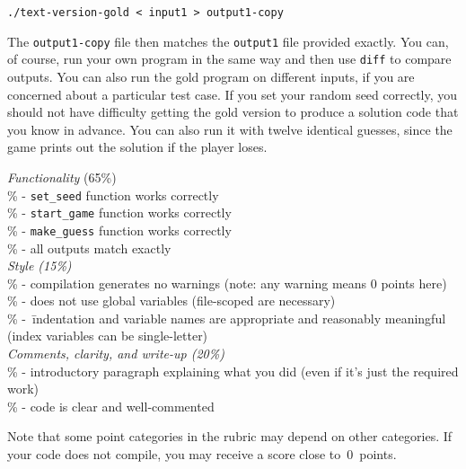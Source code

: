 \protect{\mbox{\hspace{.25in}}}%
{\tt ./text-version-gold < input1 > output1-copy}

The {\tt output1-copy} file then matches the {\tt output1} file provided 
exactly.  You can, of course, run your own program in the same way and
then use {\tt diff} to compare outputs.  You can also run the gold 
program on different inputs, if you are concerned about a particular test
case.  If you set your random seed correctly, you should not have 
difficulty getting the gold version to produce a solution code that you
know in advance.  You can also run it with twelve identical
guesses, since the game prints out the solution if the player loses.\\


\pagebreak

%
\begin{tabbing}
\textit{Func}\=\textit{tionality} (65\%)\\
  \% - {\tt set\_seed} function works correctly\\
  \% - {\tt start\_game} function works correctly\\
  \% - {\tt make\_guess} function works correctly\\
  \% - all outputs match exactly\\
\textit{Style (15\%)}\\
  \% - compilation generates no warnings (note: any warning means 0 points here)\\
  \% - does not use global variables (file-scoped are necessary)\\
  \% -~\=indentation and variable names are appropriate and reasonably meaningful\\
  \>\>(index variables can be single-letter)\\
\textit{Comments, clarity, and write-up (20\%)}\\
  \% - introductory paragraph explaining what you did (even if it's just the required work)\\
  \% - code is clear and well-commented
\end{tabbing}\vspace{-8pt}

Note that some point categories in the rubric may depend on other categories.
If your code does not compile, you may receive a score close to~0~points.


